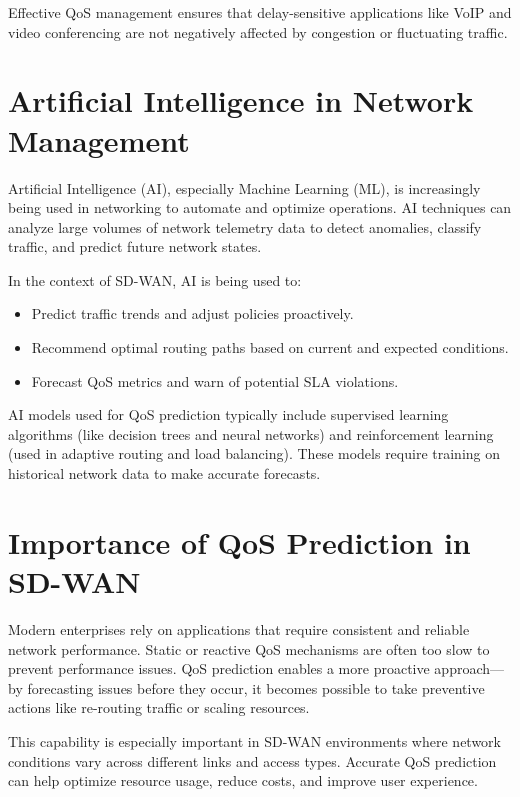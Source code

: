 \documentclass[a4paper,12pt]{Classes/RoboticsLaTeX}
\begin{document}
    Effective QoS management ensures that delay-sensitive applications like VoIP and video conferencing are not negatively affected by congestion or fluctuating traffic.
    
    \section{Artificial Intelligence in Network Management}
    
    Artificial Intelligence (AI), especially Machine Learning (ML), is increasingly being used in networking to automate and optimize operations. AI techniques can analyze large volumes of network telemetry data to detect anomalies, classify traffic, and predict future network states.
    
    In the context of SD-WAN, AI is being used to:
    \begin{itemize}
        \item Predict traffic trends and adjust policies proactively.
        \item Recommend optimal routing paths based on current and expected conditions.
        \item Forecast QoS metrics and warn of potential SLA violations.
    \end{itemize}
    
    AI models used for QoS prediction typically include supervised learning algorithms (like decision trees and neural networks) and reinforcement learning (used in adaptive routing and load balancing). These models require training on historical network data to make accurate forecasts.
    
    \section{Importance of QoS Prediction in SD-WAN}
    
    Modern enterprises rely on applications that require consistent and reliable network performance. Static or reactive QoS mechanisms are often too slow to prevent performance issues. QoS prediction enables a more proactive approach—by forecasting issues before they occur, it becomes possible to take preventive actions like re-routing traffic or scaling resources.
    
    This capability is especially important in SD-WAN environments where network conditions vary across different links and access types. Accurate QoS prediction can help optimize resource usage, reduce costs, and improve user experience.
\end{document}
